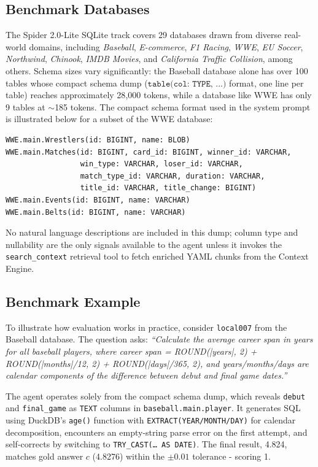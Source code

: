 \subsection{Benchmark Databases}

The Spider 2.0-Lite SQLite track covers 29 databases drawn from diverse real-world domains, including \textit{Baseball}, \textit{E-commerce}, \textit{F1 Racing}, \textit{WWE}, \textit{EU Soccer}, \textit{Northwind}, \textit{Chinook}, \textit{IMDB Movies}, and \textit{California Traffic Collision}, among others. Schema sizes vary significantly: the Baseball database alone has over 100 tables whose compact schema dump ($\texttt{table(col: TYPE, ...)}$ format, one line per table) reaches approximately 28{,}000 tokens, while a database like WWE has only 9 tables at $\sim$185 tokens. The compact schema format used in the system prompt is illustrated below for a subset of the WWE database:

\begin{verbatim}
WWE.main.Wrestlers(id: BIGINT, name: BLOB)
WWE.main.Matches(id: BIGINT, card_id: BIGINT, winner_id: VARCHAR,
                 win_type: VARCHAR, loser_id: VARCHAR,
                 match_type_id: VARCHAR, duration: VARCHAR,
                 title_id: VARCHAR, title_change: BIGINT)
WWE.main.Events(id: BIGINT, name: VARCHAR)
WWE.main.Belts(id: BIGINT, name: VARCHAR)
\end{verbatim}

No natural language descriptions are included in this dump; column type and nullability are the only signals available to the agent unless it invokes the \texttt{search\_context} retrieval tool to fetch enriched YAML chunks from the Context Engine.

\subsection{Benchmark Example}

To illustrate how evaluation works in practice, consider \texttt{local007} from the Baseball database. The question asks: \textit{``Calculate the average career span in years for all baseball players, where career span = ROUND(|years|, 2) + ROUND(|months|/12, 2) + ROUND(|days|/365, 2), and years/months/days are calendar components of the difference between debut and final game dates.''}

The agent operates solely from the compact schema dump, which reveals \texttt{debut} and \texttt{final\_game} as \texttt{TEXT} columns in \texttt{baseball.main.player}. It generates SQL using DuckDB's \texttt{age()} function with \texttt{EXTRACT(YEAR/MONTH/DAY)} for calendar decomposition, encounters an empty-string parse error on the first attempt, and self-corrects by switching to \texttt{TRY\_CAST(\ldots~AS DATE)}. The final result, 4.824, matches gold answer $c$ (4.8276) within the $\pm 0.01$ tolerance - scoring 1.

